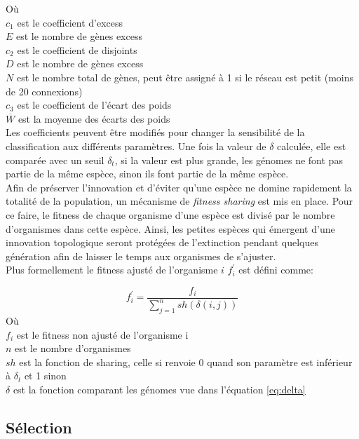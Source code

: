 \documentclass{article}
\begin{document}
Où\\
$c_1$ est le coefficient d'excess\\
$E$ est le nombre de gènes excess\\
$c_2$ est le coefficient de disjoints\\
$D$ est le nombre de gènes excess\\
$N$ est le nombre total de gènes, peut être assigné à 1 si le réseau est petit (moins de 20 connexions)\\
$c_3$ est le coefficient de l'écart des poids\\
$\overline{W}$ est la moyenne des écarts des poids\\

Les coefficients peuvent être modifiés pour changer la sensibilité de la classification aux différents paramètres. Une fois la valeur de $\delta$ calculée, elle est comparée avec un seuil $\delta_t$, si la valeur est plus grande, les génomes ne font pas partie de la même espèce, sinon ils font partie de la même espèce.\\

Afin de préserver l'innovation et d'éviter qu'une espèce ne domine rapidement la totalité de la population, un mécanisme de \textit{fitness sharing} est mis en place. Pour ce faire, le fitness de chaque organisme d'une espèce est divisé par le nombre d'organismes dans cette espèce. Ainsi, les petites espèces qui émergent d'une innovation topologique seront protégées de l'extinction pendant quelques génération afin de laisser le temps aux organismes de s'ajuster.\\

Plus formellement le fitness ajusté de l'organisme $i$ $f^\prime_i$ est défini comme:

\begin{equation}
	f^\prime_i = \frac{f_i}{\sum^n_{j=1} sh(\delta(i,j))}
\end{equation}
Où\\
$f_i$ est le fitness non ajusté de l'organisme i\\
$n$ est le nombre d'organismes\\
$sh$ est la fonction de sharing, celle si renvoie 0 quand son paramètre est inférieur à $\delta_t$ et 1 sinon\\
$\delta$ est la fonction comparant les génomes vue dans l'équation \ref{eq:delta}\\

\subsection{Sélection}
\end{document}
